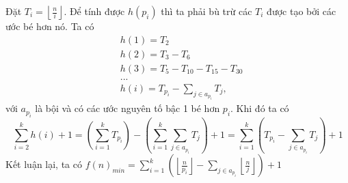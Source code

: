 \documentclass[11pt]{scrartcl}
\begin{document}
\begin{itemize}[label=, leftmargin=0em, itemsep=0.5em]
\begin{sol}
        Đặt $T_i= \left\lfloor \frac{n}{i } \right\rfloor$. Để tính được $h(p_i)$ thì ta phải bù trừ các $T_i$ được tạo bởi các ước bé hơn nó. Ta có
        \[
            \begin{aligned}
                &h(1) = T_2 \\
                &h(2) = T_3 - T_6\\
                &h(3) = T_5 - T_{10} - T_{15} - T_{30}\\
                &...\\
                &h(i) = T_{p_i} - \sum_{j \in a_{p_i}} T_j,
            \end{aligned}
        \]
        với $a_{p_i}$ là bội và có các ước nguyên tố bậc 1 bé hơn $p_i$. Khi đó ta có
        \[
            \sum_{i = 2}^k h(i) + 1 = \left(\sum_{i = 1}^k T_{p_i}\right) - \left(\sum_{i = 1}^k \sum_{j \in a_{p_i}} T_{j}\right) + 1 = \sum_{i = 1}^k\left( T_{p_i} - \sum_{j \in a_{p_i}} T_{j}\right) + 1
        \]
        Kết luận lại, ta có $\displaystyle f(n)_{min} = \sum_{i = 1}^k\left( \left\lfloor \frac{n}{p_i }\right\rfloor - \sum_{j \in a_{p_i}} \left\lfloor \frac{n}{j }\right\rfloor\right) + 1$
        

\end{sol}
\end{itemize}
\end{document}
